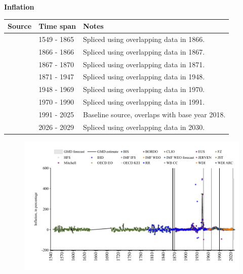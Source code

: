 \documentclass[12pt,a4paper,landscape]{article}
\begin{document}
\begin{adjustbox}{max totalsize={\paperwidth}{\paperheight},center}
\begin{minipage}[t][\textheight][t]{\textwidth}
\vspace*{0.5cm}
{}
\begin{center}
{\Large\bfseries Inflation}
\end{center}
\vspace{0.5cm}
\begin{table}[H]
\centering
\small
\begin{tabular}{|l|l|l|}
\hline
\textbf{Source} & \textbf{Time span} & \textbf{Notes} \\
\hline
\rowcolor{white}\cite{CLIO}& 1549 - 1865 &Spliced using overlapping data in 1866. \\
\rowcolor{lightgray}\cite{RR}& 1866 - 1866 &Spliced using overlapping data in 1867. \\
\rowcolor{white}\cite{CLIO}& 1867 - 1870 &Spliced using overlapping data in 1871. \\
\rowcolor{lightgray}\cite{JST}& 1871 - 1947 &Spliced using overlapping data in 1948. \\
\rowcolor{white}\cite{BIS}& 1948 - 1969 &Spliced using overlapping data in 1970. \\
\rowcolor{lightgray}\cite{WB_CC}& 1970 - 1990 &Spliced using overlapping data in 1991. \\
\rowcolor{white}\cite{OECD_EO}& 1991 - 2025 &Baseline source, overlaps with base year 2018. \\
\rowcolor{lightgray}\cite{IMF_WEO_forecast}& 2026 - 2029 &Spliced using overlapping data in 2030. \\
\hline
\end{tabular}
\end{table}
\begin{figure}[H]
\centering
\includegraphics[width=\textwidth,height=0.6\textheight,keepaspectratio]{graphs/ITA_infl.pdf}
\end{figure}
\end{minipage}
\end{adjustbox}
\end{document}
